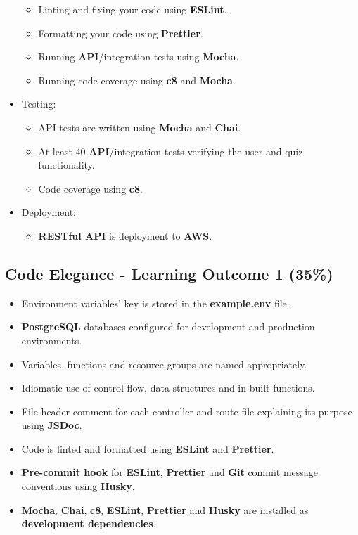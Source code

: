 \documentclass{article}
\begin{document}
\begin{itemize}
\begin{itemize}
		\item Linting and fixing your code using \textbf{ESLint}.
		\item Formatting your code using \textbf{Prettier}.
		\item Running \textbf{API}/integration tests using \textbf{Mocha}.
		\item Running code coverage using \textbf{c8} and \textbf{Mocha}.
	\end{itemize}
	\item Testing:
	\begin{itemize}
		\item API tests are written using \textbf{Mocha} and \textbf{Chai}.
		\item At least 40 \textbf{API}/integration tests verifying the user and quiz functionality.
		\item Code coverage using \textbf{c8}. 
	\end{itemize}
	\item Deployment:
	\begin{itemize}
		\item \textbf{RESTful API} is deployment to \textbf{AWS}. 
	\end{itemize}
\end{itemize}

\subsection*{Code Elegance - Learning Outcome 1 (35\%)}
\begin{itemize}
	\item Environment variables' key is stored in the \textbf{example.env} file. 
	\item \textbf{PostgreSQL} databases configured for development and production environments.
	\item Variables, functions and resource groups are named appropriately.
	\item Idiomatic use of control flow, data structures and in-built functions.
	\item File header comment for each controller and route file explaining its purpose using \textbf{JSDoc}.
	\item Code is linted and formatted using \textbf{ESLint} and \textbf{Prettier}.
	\item \textbf{Pre-commit hook} for \textbf{ESLint}, \textbf{Prettier} and \textbf{Git} commit message conventions using \textbf{Husky}.
	\item \textbf{Mocha}, \textbf{Chai}, \textbf{c8}, \textbf{ESLint}, \textbf{Prettier} and \textbf{Husky} are installed as \textbf{development dependencies}.	
\end{itemize}
\end{document}
